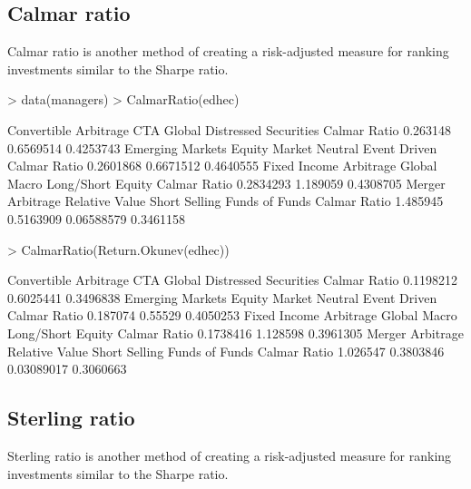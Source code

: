 \documentclass[12pt,letterpaper,english]{article}
\begin{document}
\subsection{Calmar ratio}

Calmar ratio is another method of creating a risk-adjusted measure for ranking investments similar to the Sharpe ratio.

\begin{Schunk}
\begin{Sinput}
> data(managers)
> CalmarRatio(edhec)
\end{Sinput}
\begin{Soutput}
             Convertible Arbitrage CTA Global Distressed Securities
Calmar Ratio              0.263148  0.6569514             0.4253743
             Emerging Markets Equity Market Neutral Event Driven
Calmar Ratio        0.2601868             0.6671512    0.4640555
             Fixed Income Arbitrage Global Macro Long/Short Equity
Calmar Ratio              0.2834293     1.189059         0.4308705
             Merger Arbitrage Relative Value Short Selling Funds of Funds
Calmar Ratio         1.485945      0.5163909    0.06588579      0.3461158
\end{Soutput}
\begin{Sinput}
> CalmarRatio(Return.Okunev(edhec))
\end{Sinput}
\begin{Soutput}
             Convertible Arbitrage CTA Global Distressed Securities
Calmar Ratio             0.1198212  0.6025441             0.3496838
             Emerging Markets Equity Market Neutral Event Driven
Calmar Ratio         0.187074               0.55529    0.4050253
             Fixed Income Arbitrage Global Macro Long/Short Equity
Calmar Ratio              0.1738416     1.128598         0.3961305
             Merger Arbitrage Relative Value Short Selling Funds of Funds
Calmar Ratio         1.026547      0.3803846    0.03089017      0.3060663
\end{Soutput}
\end{Schunk}

\subsection{Sterling ratio}

Sterling ratio is another method of creating a risk-adjusted measure for ranking investments similar to the Sharpe ratio.
\end{document}
